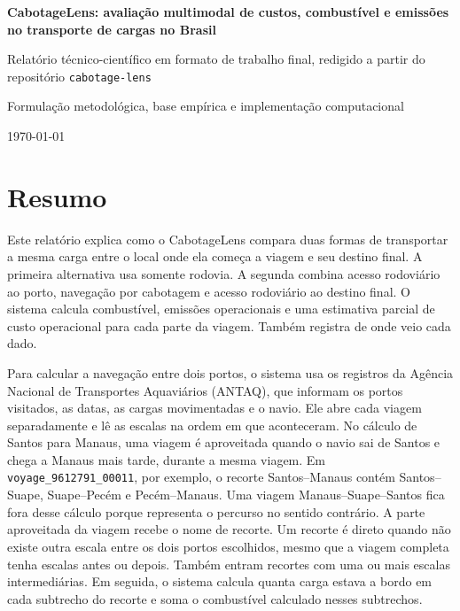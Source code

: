 \documentclass[12pt,a4paper]{report}
\begin{document}
\begin{titlepage}
\centering
{\Large\bfseries CabotageLens: avaliação multimodal de custos, combustível e emissões no transporte de cargas no Brasil\par}
\vspace{1.2cm}
{\large Relatório técnico-científico em formato de trabalho final, redigido a partir do repositório \texttt{cabotage-lens}\par}
\vspace{0.8cm}
{\large Formulação metodológica, base empírica e implementação computacional\par}
\vfill
{\large \today\par}
\end{titlepage}


\chapter*{Resumo}
Este relatório explica como o CabotageLens compara duas formas de transportar a mesma carga entre o local onde ela começa a viagem e seu destino final. A primeira alternativa usa somente rodovia. A segunda combina acesso rodoviário ao porto, navegação por cabotagem e acesso rodoviário ao destino final. O sistema calcula combustível, emissões operacionais e uma estimativa parcial de custo operacional para cada parte da viagem. Também registra de onde veio cada dado.

Para calcular a navegação entre dois portos, o sistema usa os registros da Agência Nacional de Transportes Aquaviários (ANTAQ), que informam os portos visitados, as datas, as cargas movimentadas e o navio. Ele abre cada viagem separadamente e lê as escalas na ordem em que aconteceram. No cálculo de Santos para Manaus, uma viagem é aproveitada quando o navio sai de Santos e chega a Manaus mais tarde, durante a mesma viagem. Em \texttt{voyage\_9612791\_00011}, por exemplo, o recorte Santos--Manaus contém Santos--Suape, Suape--Pecém e Pecém--Manaus. Uma viagem Manaus--Suape--Santos fica fora desse cálculo porque representa o percurso no sentido contrário. A parte aproveitada da viagem recebe o nome de recorte. Um recorte é direto quando não existe outra escala entre os dois portos escolhidos, mesmo que a viagem completa tenha escalas antes ou depois. Também entram recortes com uma ou mais escalas intermediárias. Em seguida, o sistema calcula quanta carga estava a bordo em cada subtrecho do recorte e soma o combustível calculado nesses subtrechos.
\end{document}
